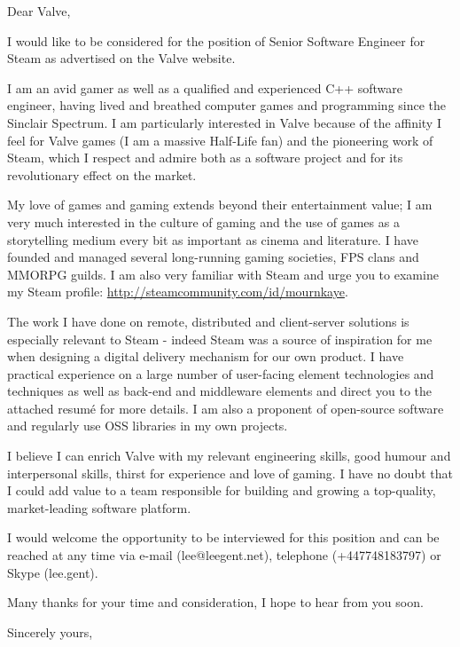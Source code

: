 \documentclass[a4paper,11pt]{letter}
\begin{document}
\begin{letter}{}
\opening{Dear Valve,}

I would like to be considered for the position of Senior Software Engineer for Steam as advertised on the Valve website.

I am an avid gamer as well as a qualified and experienced C++ software engineer, having lived and breathed computer games and programming since the Sinclair Spectrum.  I am particularly interested in Valve because of the affinity I feel for Valve games (I am a massive Half-Life fan) and the pioneering work of Steam, which I respect and admire both as a software project and for its revolutionary effect on the market.

My love of games and gaming extends beyond their entertainment value; I am very much interested in the culture of gaming and the use of games as a storytelling medium every bit as important as cinema and literature.  I have founded and managed several long-running gaming societies, FPS clans and MMORPG guilds.  I am also very familiar with Steam and urge you to examine my Steam profile: \url{http://steamcommunity.com/id/mournkaye}.

The work I have done on remote, distributed and client-server solutions is especially relevant to Steam - indeed Steam was a source of inspiration for me when designing a digital delivery mechanism for our own product.  I have practical experience on a large number of user-facing element technologies and techniques as well as back-end and middleware elements and direct you to the attached resum\'{e} for more details.  I am also a proponent of open-source software and regularly use OSS libraries in my own projects.

I believe I can enrich Valve with my relevant engineering skills, good humour and interpersonal skills, thirst for experience and love of gaming.  I have no doubt that I could add value to a team responsible for building and growing a top-quality, market-leading software platform.

I would welcome the opportunity to be interviewed for this position and can be reached at any time via e-mail (lee@leegent.net), telephone (+447748183797) or Skype (lee.gent).

Many thanks for your time and consideration, I hope to hear from you soon.
\closing{Sincerely yours,}
\end{letter}
\end{document}
